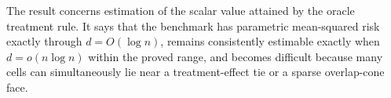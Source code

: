 The result concerns estimation of the scalar value attained by the oracle treatment rule.  It says that the benchmark has parametric mean-squared risk exactly through \(d=O(\log n)\), remains consistently estimable exactly when \(d=o(n\log n)\) within the proved range, and becomes difficult because many cells can simultaneously lie near a treatment-effect tie or a sparse overlap-cone face.